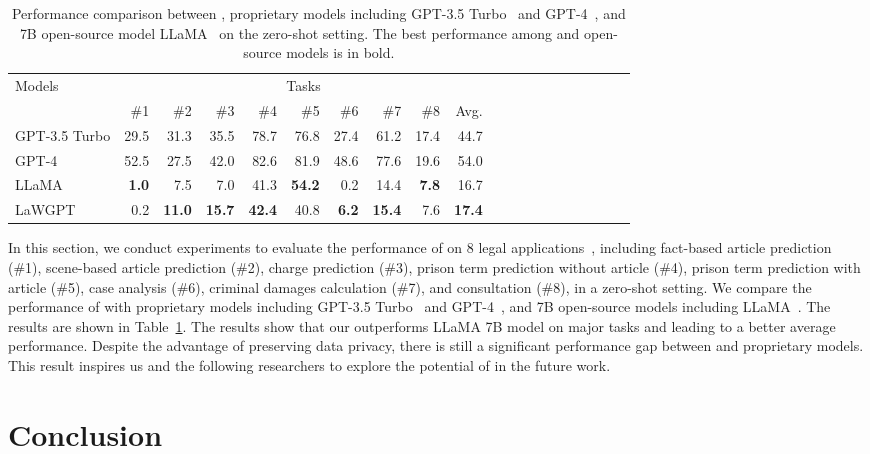 \begin{table}[th]
    \caption{Performance comparison between \algo, proprietary models including GPT-3.5 Turbo~\citep{GPT35T} and GPT-4~\citep{GPT4}, and 7B open-source model LLaMA~\citep{hugo23LLaMA} on the zero-shot setting. The best performance among \algo and open-source models is in bold.}
    \label{tab:zeroshot}
    \centering
    \begin{tabular}{l|rrrrrrrrrrrrrrrrrr|r}
        \toprule
        \multirow[l]{2}{*}{Models} & \multicolumn{9}{c}{Tasks} \\ \cmidrule{2-10}
        & \#1 & \#2 & \#3 & \#4 & \#5 & \#6 & \#7 & \#8 & Avg. \\
        \midrule
        \rowcolor[gray]{.90} GPT-3.5 Turbo & 29.5 & 31.3 & 35.5 & 78.7 & 76.8 & 27.4 & 61.2 & 17.4 & 44.7 \\
        \rowcolor[gray]{.90} GPT-4 & 52.5 & 27.5 & 42.0 & 82.6 & 81.9 & 48.6 & 77.6 & 19.6 & 54.0 \\
        \midrule
        LLaMA  & \textbf{1.0} & 7.5 & 7.0 & 41.3 & \textbf{54.2} & 0.2 & 14.4 & \textbf{7.8} & 16.7 \\
        LaWGPT & 0.2 & \textbf{11.0} & \textbf{15.7} & \textbf{42.4} & 40.8 & \textbf{6.2} & \textbf{15.4} & 7.6 & \textbf{17.4} \\
        \bottomrule
    \end{tabular}
\end{table}

In this section, we conduct experiments to evaluate the performance of \algo on 8 legal applications~\citep{li2023LawBench}, including fact-based article prediction (\#1), scene-based article prediction (\#2), charge prediction (\#3), prison term prediction without article (\#4), prison term prediction with article (\#5), case analysis (\#6), criminal damages calculation (\#7), and consultation (\#8), in a zero-shot setting. 
We compare the performance of \algo with proprietary models including GPT-3.5 Turbo~\citep{GPT35T} and GPT-4~\citep{GPT4}, and 7B open-source models including LLaMA~\citep{hugo23LLaMA}. The results are shown in Table~\ref{tab:zeroshot}. 
The results show that our \algo outperforms LLaMA 7B model on major tasks and leading to a better average performance. 
Despite the advantage of preserving data privacy, there is still a significant performance gap between \algo and proprietary models. This result inspires us and the following researchers to explore the potential of \algo in the future work. 

\section{Conclusion}
\label{sec:conclusion}

